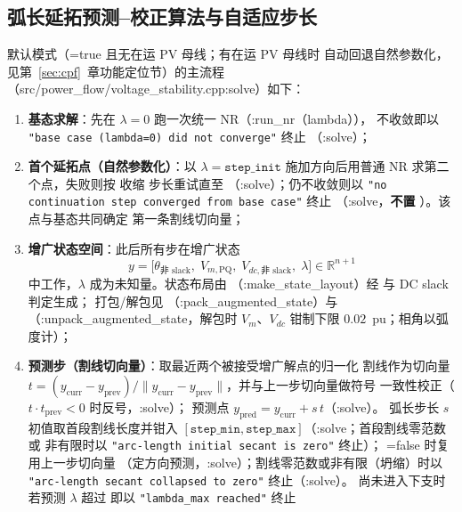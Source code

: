 \subsection{弧长延拓预测--校正算法与自适应步长}
默认模式（=true 且无在运 PV 母线；有在运 PV 母线时
自动回退自然参数化，见第~\ref{sec:cpf}~章功能定位节）的主流程
（src/power\_flow/voltage\_stability.cpp:solve）如下：
\begin{enumerate}
  \item \textbf{基态求解}：先在 $\lambda=0$ 跑一次统一 NR（:run\_nr（lambda）），
        不收敛即以 \texttt{"base case (lambda=0) did not converge"} 终止
        （:solve）；
  \item \textbf{首个延拓点（自然参数化）}：以 $\lambda=\texttt{step\_init}$
        施加方向后用普通 NR 求第二个点，失败则按  收缩
        步长重试直至 （:solve）；仍不收敛则以
        \texttt{"no continuation step converged from base case"} 终止
        （:solve，\textbf{不置} ）。该点与基态共同确定
        第一条割线切向量；
  \item \textbf{增广状态空间}：此后所有步在增广状态
        \[
        y=\bigl[\theta_{\text{非 slack}},\;V_{m,\text{PQ}},\;
        V_{dc,\text{非 slack}},\;\lambda\bigr]\in\mathbb{R}^{n+1}
        \]
        中工作，$\lambda$ 成为未知量。状态布局由
        （:make\_state\_layout）经
         与 DC slack 判定生成；
        打包/解包见 （:pack\_augmented\_state）与
        （:unpack\_augmented\_state，解包时
        $V_m$、$V_{dc}$ 钳制下限 $0.02$~pu；相角以弧度计）；
  \item \textbf{预测步（割线切向量）}：取最近两个被接受增广解点的归一化
        割线作为切向量 $t=(y_{\mathrm{curr}}-y_{\mathrm{prev}})/
        \|y_{\mathrm{curr}}-y_{\mathrm{prev}}\|$，并与上一步切向量做符号
        一致性校正（$t\cdot t_{\mathrm{prev}}<0$ 时反号，:solve）；
        预测点 $y_{\mathrm{pred}}=y_{\mathrm{curr}}+s\,t$（:solve）。
        弧长步长 $s$ 初值取首段割线长度并钳入
        $[\texttt{step\_min},\texttt{step\_max}]$（:solve；首段割线零范数或
        非有限时以 \texttt{"arc-length initial secant is zero"} 终止）；
        =false 时复用上一步切向量
        （定方向预测，:solve）；割线零范数或非有限（坍缩）时以
        \texttt{"arc-length secant collapsed to zero"} 终止（:solve）。
        尚未进入下支时若预测 $\lambda$ 超过
         即以 \texttt{"lambda\_max reached"} 终止

\end{enumerate}
